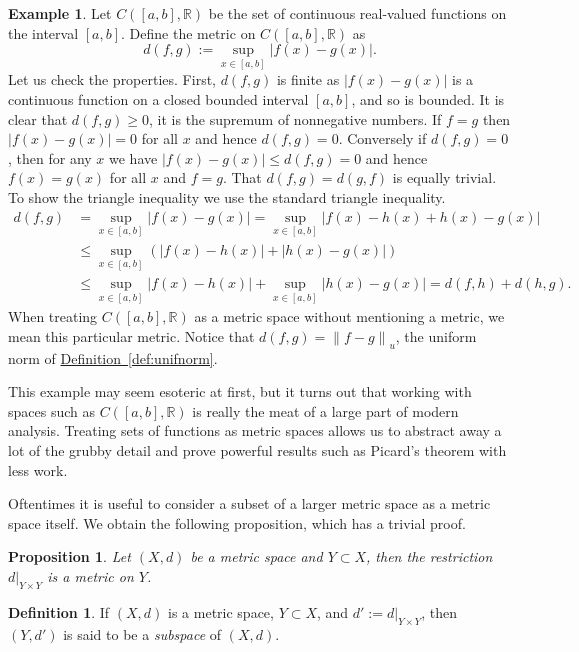 \documentclass[12pt]{book}
\newcommand{\abs}[1]{\left\lvert {#1} \right\rvert}
\newcommand{\norm}[1]{\left\lVert {#1} \right\rVert}
\newcommand{\R}{{\mathbb{R}}}
\newcommand{\myindex}[1]{#1\index{#1}}
\theoremstyle{plain}
\newtheorem{prop}[thm]{Proposition}
\theoremstyle{remark}
\theoremstyle{definition}
\newtheorem{defn}[thm]{Definition}
\theoremstyle{exercise}
\theoremstyle{example}
\newtheorem{example}[thm]{Example}
\newcommand{\defnref}[1]{\hyperref[#1]{Definition~\ref*{#1}}}
\begin{document}
\begin{example} \label{example:msC01}
Let $C([a,b],\R)$ be the set of continuous real-valued functions on the
interval $[a,b]$.  Define the metric on $C([a,b],\R)$ as
\begin{equation*}
d(f,g) := \sup_{x \in [a,b]} \abs{f(x)-g(x)} .
\end{equation*}
Let us check the properties.  First, $d(f,g)$ is finite as
$\abs{f(x)-g(x)}$ is a continuous function on a closed bounded interval
$[a,b]$, and so is bounded.
It is clear that $d(f,g) \geq 0$, 
it is the supremum of nonnegative numbers.  If $f = g$
then $\abs{f(x)-g(x)} = 0$ for all $x$ and hence $d(f,g) = 0$.  Conversely
if $d(f,g) = 0$, then for any $x$ we have $\abs{f(x)-g(x)} \leq d(f,g) = 0$
and hence $f(x) = g(x)$ for all $x$ and $f=g$.  That $d(f,g) = d(g,f)$
is equally trivial.  To show the triangle inequality we use the standard
triangle inequality.
\begin{equation*}
\begin{split}
d(f,g) & =
\sup_{x \in [a,b]} \abs{f(x)-g(x)} =
\sup_{x \in [a,b]} \abs{f(x)-h(x)+h(x)-g(x)}
\\
& \leq
\sup_{x \in [a,b]} ( \abs{f(x)-h(x)}+\abs{h(x)-g(x)} )
\\
& \leq
\sup_{x \in [a,b]} \abs{f(x)-h(x)}+
\sup_{x \in [a,b]} \abs{h(x)-g(x)} = d(f,h) + d(h,g) .
\end{split}
\end{equation*}
When treating $C([a,b],\R)$ as a metric space without mentioning a metric, we mean this
particular metric.
Notice that $d(f,g) = \norm{f-g}_u$, the uniform norm of \defnref{def:unifnorm}.

This example may seem esoteric at first, but it turns out that working with
spaces such as $C([a,b],\R)$ is really the meat of a large part of modern 
analysis.  Treating sets of functions as metric spaces allows us to
abstract away a lot of the grubby detail and prove powerful results such as
Picard's theorem with less work.
\end{example}

Oftentimes it is useful to consider a subset of a larger metric space
as a metric space itself.  We obtain the following proposition, which has
a trivial proof.

\begin{prop}
Let $(X,d)$ be a metric space and $Y \subset X$, then the restriction
$d|_{Y \times Y}$ is a metric on $Y$.
\end{prop}

\begin{defn}
If $(X,d)$ is a metric space, $Y \subset X$, and $d' := d|_{Y \times Y}$,
then $(Y,d')$ is said to be a \emph{\myindex{subspace}} of $(X,d)$.
\end{defn}
\end{document}
